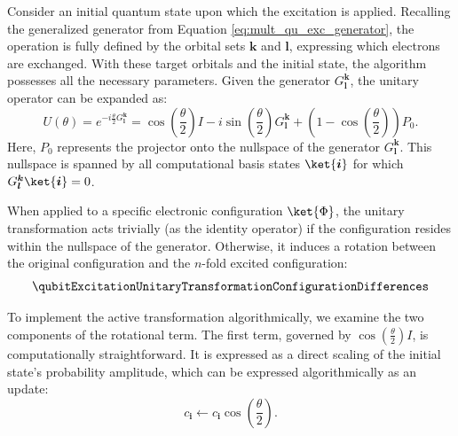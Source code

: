 Consider an initial quantum state upon which the excitation is applied. Recalling the generalized generator from Equation \eqref{eq:mult_qu_exc_generator}, the operation is fully defined by the orbital sets $\boldsymbol{k}$ and $\boldsymbol{l}$, expressing which electrons are exchanged. With these target orbitals and the initial state, the algorithm possesses all the necessary parameters. Given the generator $G^{\boldsymbol{k}}_{\boldsymbol{l}}$, the unitary operator can be expanded as:
\begin{equation}
	U(\theta) = e^{-i\frac{\theta}{2}G^{\boldsymbol{k}}_{\boldsymbol{l}}} = \cos\left(\frac{\theta}{2}\right) I - i\sin\left(\frac{\theta}{2}\right)G^{\boldsymbol{k}}_{\boldsymbol{l}} + \left(1 - \cos\left(\frac{\theta}{2}\right)\right) P_0.
\end{equation}
Here, $P_0$ represents the projector onto the nullspace of the generator $G^{\boldsymbol{k}}_{\boldsymbol{l}}$. This nullspace is spanned by all computational basis states $\ket{\boldsymbol{i}}$ for which $G^{\boldsymbol{k}}_{\boldsymbol{l}} \ket{\boldsymbol{i}} = 0$.

When applied to a specific electronic configuration $\ket{\Phi}$, the unitary transformation acts trivially (as the identity operator) if the configuration resides within the nullspace of the generator. Otherwise, it induces a rotation between the original configuration and the $n$-fold excited configuration:
\begin{equation} \label{eq:qubit-excitation-unitary-transformation-configuration-differences}
	\qubitExcitationUnitaryTransformationConfigurationDifferences
\end{equation}

To implement the active transformation algorithmically, we examine the two components of the rotational term. The first term, governed by $\cos\left(\frac{\theta}{2}\right) I$, is computationally straightforward. It is expressed as a direct scaling of the initial state's probability amplitude, which can be expressed algorithmically as an update:
\begin{equation}
	c_{\boldsymbol{i}} \leftarrow c_{\boldsymbol{i}} \cos\left(\frac{\theta}{2}\right).\label{eq:qubit-excitation-update-basis-state}
\end{equation}

